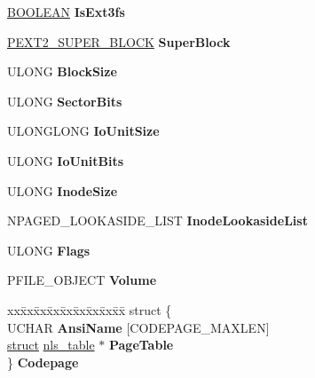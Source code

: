 \begin{DoxyCompactItemize}
\item 
\mbox{\label{struct___e_x_t2___v_c_b_a46a848b5626500cf48bd7ffce8e21929}} 
\hyperlink{_processor_bind_8h_a112e3146cb38b6ee95e64d85842e380a}{B\+O\+O\+L\+E\+AN} {\bfseries Is\+Ext3fs}
\item 
\mbox{\label{struct___e_x_t2___v_c_b_a3bd8f860515036c1397eea0513d263d4}} 
\hyperlink{structext2__sblock}{P\+E\+X\+T2\+\_\+\+S\+U\+P\+E\+R\+\_\+\+B\+L\+O\+CK} {\bfseries Super\+Block}
\item 
\mbox{\label{struct___e_x_t2___v_c_b_a3d97ad389065c44093cee336b41341f4}} 
U\+L\+O\+NG {\bfseries Block\+Size}
\item 
\mbox{\label{struct___e_x_t2___v_c_b_a1399a99ada2f740d9d3dd4cfd9e466a0}} 
U\+L\+O\+NG {\bfseries Sector\+Bits}
\item 
\mbox{\label{struct___e_x_t2___v_c_b_a7755a950a755b8215db9948d96091e4a}} 
U\+L\+O\+N\+G\+L\+O\+NG {\bfseries Io\+Unit\+Size}
\item 
\mbox{\label{struct___e_x_t2___v_c_b_a94174b62b554b220379720872bee47db}} 
U\+L\+O\+NG {\bfseries Io\+Unit\+Bits}
\item 
\mbox{\label{struct___e_x_t2___v_c_b_abeecb8095014bb4e876ffe920154690a}} 
U\+L\+O\+NG {\bfseries Inode\+Size}
\item 
\mbox{\label{struct___e_x_t2___v_c_b_ad12e9bb572937771f28045639d3c34b4}} 
N\+P\+A\+G\+E\+D\+\_\+\+L\+O\+O\+K\+A\+S\+I\+D\+E\+\_\+\+L\+I\+ST {\bfseries Inode\+Lookaside\+List}
\item 
\mbox{\label{struct___e_x_t2___v_c_b_a5b780ec1db9c8e0fc64a744e8c648c90}} 
U\+L\+O\+NG {\bfseries Flags}
\item 
\mbox{\label{struct___e_x_t2___v_c_b_a61be551beea1de75c6f0487dc206c7ff}} 
P\+F\+I\+L\+E\+\_\+\+O\+B\+J\+E\+CT {\bfseries Volume}
\item 
\mbox{\label{struct___e_x_t2___v_c_b_a616370c196418c34e6bd54817757637a}} 
\begin{tabbing}
xx\=xx\=xx\=xx\=xx\=xx\=xx\=xx\=xx\=\kill
struct \{\\
\>UCHAR {\bfseries AnsiName} \mbox{[}CODEPAGE\_MAXLEN\mbox{]}\\
\>\hyperlink{interfacestruct}{struct} \hyperlink{structnls__table}{nls\_table} $\ast$ {\bfseries PageTable}\\
\} {\bfseries Codepage}\\


\end{tabbing}
\end{DoxyCompactItemize}
